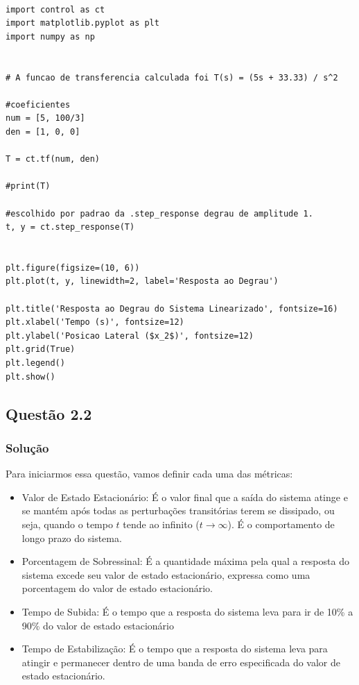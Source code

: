 \documentclass[a4paper,11pt]{article}
\begin{document}
\begin{lstlisting}[caption = {Código da Questão 2.1}, label={code:t2q1}]

import control as ct
import matplotlib.pyplot as plt
import numpy as np


# A funcao de transferencia calculada foi T(s) = (5s + 33.33) / s^2

#coeficientes
num = [5, 100/3]
den = [1, 0, 0]

T = ct.tf(num, den)

#print(T)

#escolhido por padrao da .step_response degrau de amplitude 1.
t, y = ct.step_response(T)


plt.figure(figsize=(10, 6))
plt.plot(t, y, linewidth=2, label='Resposta ao Degrau')

plt.title('Resposta ao Degrau do Sistema Linearizado', fontsize=16)
plt.xlabel('Tempo (s)', fontsize=12)
plt.ylabel('Posicao Lateral ($x_2$)', fontsize=12)
plt.grid(True)
plt.legend()
plt.show()

\end{lstlisting}
\newpage
\subsection*{\sc Questão 2.2}

\subsubsection*{\sc Solução}
Para iniciarmos essa questão, vamos definir cada uma das métricas:
\begin{itemize}
    \item Valor de Estado Estacionário: É o valor final que a saída do sistema atinge e se mantém após todas as perturbações transitórias terem se dissipado, ou seja, quando o tempo $t$ tende ao infinito ($t \to \infty$). É o comportamento de longo prazo do sistema.
    \item Porcentagem de Sobressinal: É a quantidade máxima pela qual a resposta do sistema excede seu valor de estado estacionário, expressa como uma porcentagem do valor de estado estacionário. 
    \item Tempo de Subida: É o tempo que a resposta do sistema leva para ir de 10\% a 90\% do valor de estado estacionário
    \item Tempo de Estabilização: É o tempo que a resposta do sistema leva para atingir e permanecer dentro de uma banda de erro especificada do valor de estado estacionário.
\end{itemize}
\end{document}

